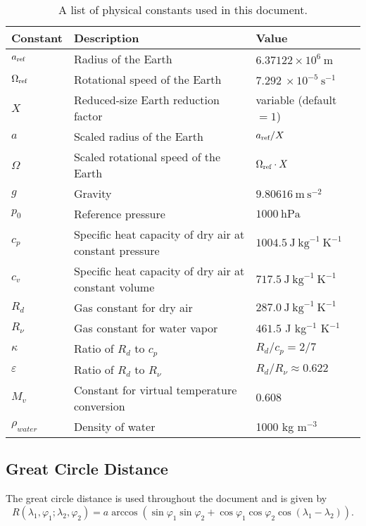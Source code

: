 \documentclass[times,doublespace]{fldauth}
\begin{document}
\begin{table}[h]
\caption{A list of physical constants used in this document.} \label{tab:PhysicalConstants}
\begin{tabular*}{\textwidth}{@{\extracolsep{\fill}}lll}
\hline Constant & Description & Value \\
\hline $a_{\tiny \mbox{ref}}$ & Radius of the Earth & $6.37122 \times 10^{6}\ \mbox{m}$ \\
$\Omega_{\tiny \mbox{ref}}$ & Rotational speed of the Earth & $7.292\ \times 10^{-5}\ \mbox{s}^{-1}$ \\
$X$ & Reduced-size Earth reduction factor & variable (default $= 1$) \\
$a$ & Scaled radius of the Earth & $a_{\tiny \mbox{ref}} / X$ \\
$\Omega$ & Scaled rotational speed of the Earth & $\Omega_{\tiny \mbox{ref}} \cdot X$ \\
$g$ & Gravity & $9.80616\ \mbox{m}\ \mbox{s}^{-2}$ \\
$p_0$ & Reference pressure & $1000\ \mbox{hPa}$ \\
$c_p$ & Specific heat capacity of dry air at constant pressure & $1004.5\ \mbox{J}\ \mbox{kg}^{-1}\ \mbox{K}^{-1}$ \\
$c_v$ & Specific heat capacity of dry air at constant volume & $717.5\ \mbox{J}\ \mbox{kg}^{-1}\ \mbox{K}^{-1}$ \\
$R_d$ & Gas constant for dry air & $287.0\ \mbox{J}\ \mbox{kg}^{-1}\ \mbox{K}^{-1}$ \\
$R_\nu$ & Gas constant for water vapor & $461.5$ J kg$^{-1}$ K$^{-1}$ \\
$\kappa$ & Ratio of $R_d$ to $c_p$ & $R_d/c_p = 2/7$ \\
$\varepsilon$ & Ratio of $R_d$ to $R_\nu$ & $R_d/R_\nu \approx 0.622$ \\
$M_v$ & Constant for virtual temperature conversion & $0.608$ \\
$\rho_{water}$ & Density of water & 1000 kg m$^{-3}$ \\
\hline 
\end{tabular*}

\end{table}

\subsection{Great Circle Distance}

The great circle distance is used throughout the document and is given by
\begin{equation}
R(\lambda_1, \varphi_1; \lambda_2, \varphi_2) = a \arccos \left( \sin \varphi_1 \sin \varphi_2 + \cos \varphi_1 \cos \varphi_2 \cos (\lambda_1 - \lambda_2) \right).
\end{equation}
\end{document}
